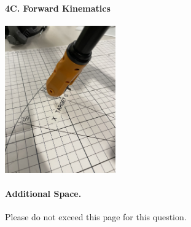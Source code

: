 \paragraph{4C. Forward Kinematics}
\begin{center}
    \includegraphics[height=2.5in]{image/4c_b.jpg}
\end{center}

\newpage
\paragraph{Additional Space.}
Please do not exceed this page for this question.
